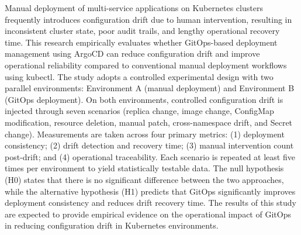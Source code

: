 \documentclass[proposal,indonesia]{ugmskripsi}
\begin{document}
\abstracteng
Manual deployment of multi-service applications on Kubernetes clusters frequently introduces configuration drift due to human intervention, resulting in inconsistent cluster state, poor audit trails, and lengthy operational recovery time. This research empirically evaluates whether GitOps-based deployment management using ArgoCD can reduce configuration drift and improve operational reliability compared to conventional manual deployment workflows using kubectl. The study adopts a controlled experimental design with two parallel environments: Environment A (manual deployment) and Environment B (GitOps deployment). On both environments, controlled configuration drift is injected through seven scenarios (replica change, image change, ConfigMap modification, resource deletion, manual patch, cross-namespace drift, and Secret change). Measurements are taken across four primary metrics: (1) deployment consistency; (2) drift detection and recovery time; (3) manual intervention count post-drift; and (4) operational traceability. Each scenario is repeated at least five times per environment to yield statistically testable data. The null hypothesis (H0) states that there is no significant difference between the two approaches, while the alternative hypothesis (H1) predicts that GitOps significantly improves deployment consistency and reduces drift recovery time. The results of this study are expected to provide empirical evidence on the operational impact of GitOps in reducing configuration drift in Kubernetes environments.
\endabstracteng







\end{document}
